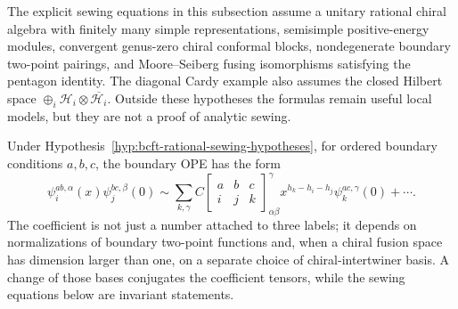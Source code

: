 \begin{hypothesis}
\label{hyp:bcft-rational-sewing-hypotheses}
The explicit sewing equations in this subsection assume a unitary rational
chiral algebra with finitely many simple representations, semisimple
positive-energy modules, convergent genus-zero chiral conformal blocks,
nondegenerate boundary two-point pairings, and Moore--Seiberg fusing
isomorphisms satisfying the pentagon identity.  The diagonal Cardy example
also assumes the closed Hilbert space
\(\oplus_i\mathcal H_i\otimes\overline{\mathcal H_i}\).  Outside these
hypotheses the formulas remain useful local models, but they are not a proof
of analytic sewing.
\end{hypothesis}

Under Hypothesis~\ref{hyp:bcft-rational-sewing-hypotheses}, for ordered
boundary conditions \(a,b,c\), the boundary OPE has the form
\begin{equation}
  \psi^{ab,\alpha}_i(x)\psi^{bc,\beta}_j(0)
  \sim
  \sum_{k,\gamma}
  C\!\begin{bmatrix} a&b&c\\ i&j&k \end{bmatrix}_{\alpha\beta}^{\gamma}
  x^{h_k-h_i-h_j}
  \psi^{ac,\gamma}_k(0)+\cdots .
  \label{eq:boundary-changing-ope}
\end{equation}
The coefficient is not just a number attached to three labels; it depends on
normalizations of boundary two-point functions and, when a chiral fusion space
has dimension larger than one, on a separate choice of chiral-intertwiner
basis.  A change of those bases conjugates the coefficient tensors, while the
sewing equations below are invariant statements.

